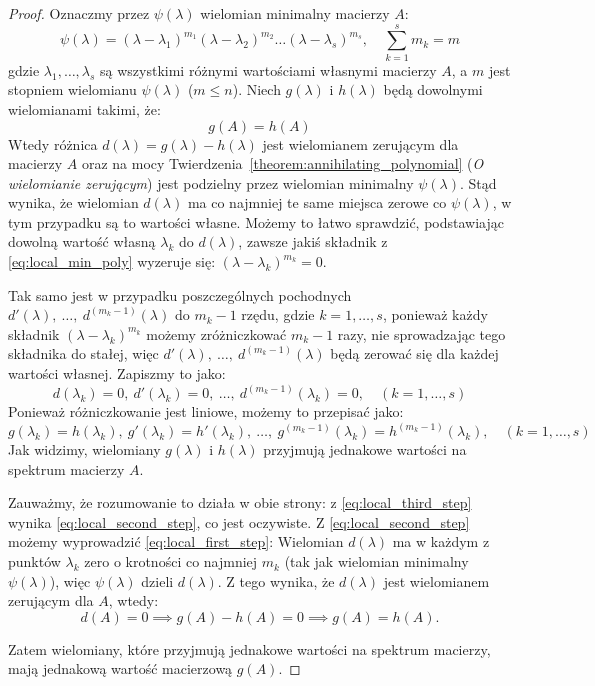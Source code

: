 \begin{proof}
    Oznaczmy przez $\psi(\lambda)$ wielomian minimalny macierzy $A$:
    \begin{equation}\label{eq:local_min_poly}
        \psi(\lambda) = (\lambda - \lambda_1)^{m_1}(\lambda - \lambda_2)^{m_2}\ldots(\lambda - \lambda_s)^{m_s}, \quad \sum_{k=1}^{s}{m_k} = m
    \end{equation}
    gdzie $\lambda_1, \ldots, \lambda_s$ są wszystkimi różnymi wartościami własnymi macierzy $A$, a $m$ jest stopniem wielomianu $\psi(\lambda)$ ($m \le n$).
    Niech $g(\lambda)$ i $h(\lambda)$ będą dowolnymi wielomianami takimi, że:
    \begin{equation}\label{eq:local_first_step}
        g(A) = h(A)
    \end{equation}
    Wtedy różnica $d(\lambda) = g(\lambda) - h(\lambda)$ jest wielomianem zerującym dla macierzy $A$ oraz na mocy Twierdzenia~\ref{theorem:annihilating_polynomial} (\textit{O wielomianie zerującym}) jest podzielny przez wielomian minimalny $\psi(\lambda)$. Stąd wynika, że wielomian $d(\lambda)$ ma co najmniej te same miejsca zerowe co $\psi(\lambda)$, w tym przypadku są to wartości własne. Możemy to łatwo sprawdzić, podstawiając dowolną wartość własną $\lambda_k$ do $d(\lambda)$, zawsze jakiś składnik z \eqref{eq:local_min_poly} wyzeruje się: $(\lambda - \lambda_k)^{m_k} = 0$.
    
    Tak samo jest w przypadku poszczególnych pochodnych $d'(\lambda), \ \ldots, \ d^{(m_k - 1)}(\lambda)$ do $m_k - 1$ rzędu, gdzie $k = 1, \ldots, s$, ponieważ każdy składnik $(\lambda - \lambda_k)^{m_k}$ możemy zróżniczkować $m_k - 1$ razy, nie sprowadzając tego składnika do stałej, więc $d'(\lambda), \ \ldots, \ d^{(m_k - 1)}(\lambda)$ będą zerować się dla każdej wartości własnej. Zapiszmy to jako:
    \begin{equation}\label{eq:local_second_step}
        d(\lambda_k) = 0, \ d'(\lambda_k) = 0, \ \ldots, \ d^{(m_k - 1)}(\lambda_k) = 0, \quad (k = 1, \ldots, s)
    \end{equation}
    Ponieważ różniczkowanie jest liniowe, możemy to przepisać jako:
    \begin{equation}\label{eq:local_third_step}
        g(\lambda_k) = h(\lambda_k), \ g'(\lambda_k) = h'(\lambda_k), \ \ldots, \ g^{(m_k - 1)}(\lambda_k) = h^{(m_k - 1)}(\lambda_k), \quad (k = 1, \ldots, s)
    \end{equation}
    Jak widzimy, wielomiany $g(\lambda)$ i $h(\lambda)$ przyjmują jednakowe wartości na spektrum macierzy $A$. 
    
    Zauważmy, że rozumowanie to działa w obie strony: z \eqref{eq:local_third_step} wynika \eqref{eq:local_second_step}, co jest oczywiste. Z \eqref{eq:local_second_step} możemy wyprowadzić \eqref{eq:local_first_step}: 
    Wielomian $d(\lambda)$ ma w każdym z punktów $\lambda_k$ zero o krotności co najmniej $m_k$ (tak jak wielomian minimalny $\psi(\lambda)$), więc $\psi(\lambda)$ dzieli $d(\lambda)$. Z tego wynika, że $d(\lambda)$ jest wielomianem zerującym dla $A$, wtedy:
$$d(A) = 0 \implies g(A) - h(A) = 0 \implies g(A) = h(A).$$

    Zatem wielomiany, które przyjmują jednakowe wartości na spektrum macierzy, mają jednakową wartość macierzową $g(A)$.
\end{proof}
